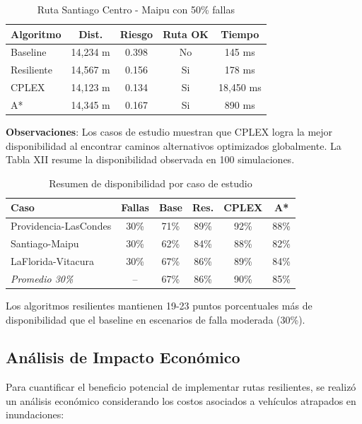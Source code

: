 \documentclass[conference]{IEEEtran}
\begin{document}
\begin{table}[!t]
\centering
\caption{Ruta Santiago Centro - Maipu con 50\% fallas}
\begin{tabular}{@{}lcccc@{}}
\toprule
\textbf{Algoritmo} & \textbf{Dist.} & \textbf{Riesgo} & \textbf{Ruta OK} & \textbf{Tiempo} \\
\midrule
Baseline & 14,234 m & 0.398 & No & 145 ms \\
Resiliente & 14,567 m & 0.156 & Si & 178 ms \\
CPLEX & 14,123 m & 0.134 & Si & 18,450 ms \\
A* & 14,345 m & 0.167 & Si & 890 ms \\
\bottomrule
\end{tabular}
\end{table}

\textbf{Observaciones}: Los casos de estudio muestran que CPLEX logra la mejor disponibilidad al encontrar caminos alternativos optimizados globalmente. La Tabla XII resume la disponibilidad observada en 100 simulaciones.

\begin{table}[!t]
\centering
\caption{Resumen de disponibilidad por caso de estudio}
\begin{tabular}{@{}lccccc@{}}
\toprule
\textbf{Caso} & \textbf{Fallas} & \textbf{Base} & \textbf{Res.} & \textbf{CPLEX} & \textbf{A*} \\
\midrule
Providencia-LasCondes & 30\% & 71\% & 89\% & 92\% & 88\% \\
Santiago-Maipu & 30\% & 62\% & 84\% & 88\% & 82\% \\
LaFlorida-Vitacura & 30\% & 67\% & 86\% & 89\% & 84\% \\
\midrule
\textit{Promedio 30\%} & -- & 67\% & 86\% & 90\% & 85\% \\
\bottomrule
\end{tabular}
\end{table}

Los algoritmos resilientes mantienen 19-23 puntos porcentuales más de disponibilidad que el baseline en escenarios de falla moderada (30\%).

\subsection{Análisis de Impacto Económico}

Para cuantificar el beneficio potencial de implementar rutas resilientes, se realizó un análisis económico considerando los costos asociados a vehículos atrapados en inundaciones:
\end{document}
